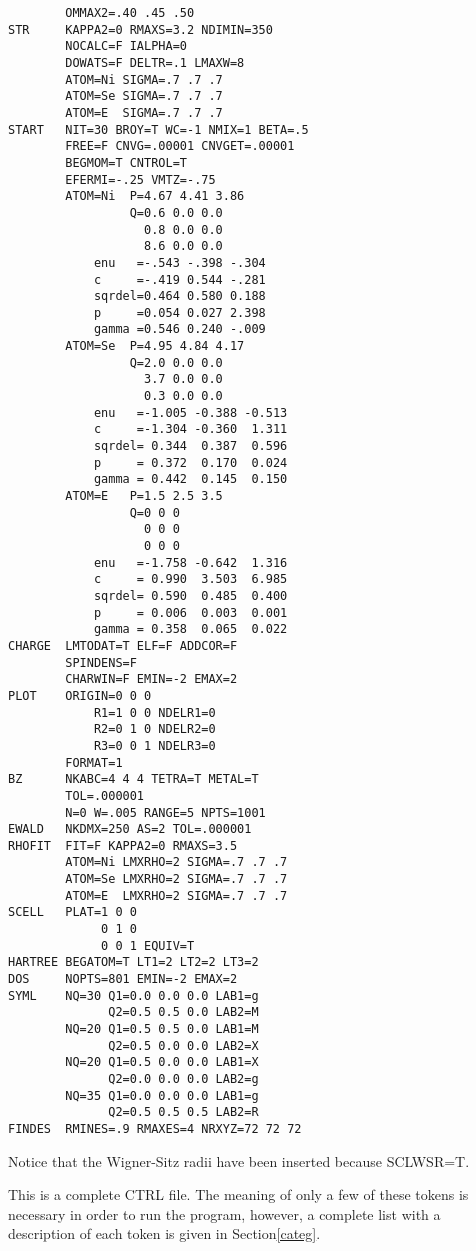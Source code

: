 \documentclass[aps,twocolumn,a4]{revtex4}
\begin{document}
\begin{enumerate}
\begin{verbatim}
        OMMAX2=.40 .45 .50
STR     KAPPA2=0 RMAXS=3.2 NDIMIN=350
        NOCALC=F IALPHA=0
        DOWATS=F DELTR=.1 LMAXW=8
        ATOM=Ni SIGMA=.7 .7 .7
        ATOM=Se SIGMA=.7 .7 .7
        ATOM=E  SIGMA=.7 .7 .7
START   NIT=30 BROY=T WC=-1 NMIX=1 BETA=.5
        FREE=F CNVG=.00001 CNVGET=.00001
        BEGMOM=T CNTROL=T
        EFERMI=-.25 VMTZ=-.75
        ATOM=Ni  P=4.67 4.41 3.86
                 Q=0.6 0.0 0.0
                   0.8 0.0 0.0
                   8.6 0.0 0.0
            enu   =-.543 -.398 -.304
            c     =-.419 0.544 -.281
            sqrdel=0.464 0.580 0.188
            p     =0.054 0.027 2.398
            gamma =0.546 0.240 -.009
        ATOM=Se  P=4.95 4.84 4.17
                 Q=2.0 0.0 0.0
                   3.7 0.0 0.0
                   0.3 0.0 0.0
            enu   =-1.005 -0.388 -0.513
            c     =-1.304 -0.360  1.311
            sqrdel= 0.344  0.387  0.596
            p     = 0.372  0.170  0.024
            gamma = 0.442  0.145  0.150
        ATOM=E   P=1.5 2.5 3.5
                 Q=0 0 0
                   0 0 0
                   0 0 0
            enu   =-1.758 -0.642  1.316
            c     = 0.990  3.503  6.985
            sqrdel= 0.590  0.485  0.400
            p     = 0.006  0.003  0.001
            gamma = 0.358  0.065  0.022
CHARGE  LMTODAT=T ELF=F ADDCOR=F 
        SPINDENS=F
        CHARWIN=F EMIN=-2 EMAX=2
PLOT    ORIGIN=0 0 0
            R1=1 0 0 NDELR1=0
            R2=0 1 0 NDELR2=0
            R3=0 0 1 NDELR3=0
        FORMAT=1
BZ      NKABC=4 4 4 TETRA=T METAL=T
        TOL=.000001
        N=0 W=.005 RANGE=5 NPTS=1001
EWALD   NKDMX=250 AS=2 TOL=.000001
RHOFIT  FIT=F KAPPA2=0 RMAXS=3.5
        ATOM=Ni LMXRHO=2 SIGMA=.7 .7 .7
        ATOM=Se LMXRHO=2 SIGMA=.7 .7 .7
        ATOM=E  LMXRHO=2 SIGMA=.7 .7 .7
SCELL   PLAT=1 0 0
             0 1 0
             0 0 1 EQUIV=T
HARTREE BEGATOM=T LT1=2 LT2=2 LT3=2
DOS     NOPTS=801 EMIN=-2 EMAX=2
SYML    NQ=30 Q1=0.0 0.0 0.0 LAB1=g
              Q2=0.5 0.5 0.0 LAB2=M
        NQ=20 Q1=0.5 0.5 0.0 LAB1=M
              Q2=0.5 0.0 0.0 LAB2=X
        NQ=20 Q1=0.5 0.0 0.0 LAB1=X
              Q2=0.0 0.0 0.0 LAB2=g
        NQ=35 Q1=0.0 0.0 0.0 LAB1=g
              Q2=0.5 0.5 0.5 LAB2=R
FINDES  RMINES=.9 RMAXES=4 NRXYZ=72 72 72
\end{verbatim}

Notice that the Wigner-Sitz radii have been inserted because
SCLWSR=T.

This is a complete CTRL file. The meaning of only a few of these
tokens is necessary in order to run the program, however, a complete
list with a description of each token
is given in Section\ref{categ}.


\end{enumerate}
\end{document}
